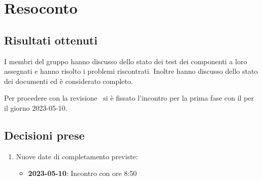 \section{Resoconto}

\subsection{Risultati ottenuti}

I membri del gruppo hanno discusso dello stato dei test dei componenti a loro assegnati e hanno risolto i problemi riscontrati. Inoltre hanno discusso dello stato dei documenti ed è considerato completo.

Per procedere con la revisione \PB\  si è fissato l'incontro per la prima fase con il \cardin per il giorno 2023-05-10.

\subsection{Decisioni prese}

\begin{enumerate}

    \item Nuove date di completamento previste:
    \begin{itemize}
        \item \textbf{2023-05-10}: Incontro con \cardin ore 8:50
    \end{itemize}

\end{enumerate}

